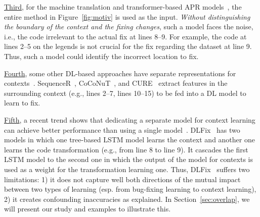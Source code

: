 
\underline{Third}, for the machine translation and transformer-based
APR
models~\cite{hata2018learning,tufano2019learning,tufano2018empirical},
the entire method in Figure~\ref{fig:motiv} is used as the input. {\em
  Without distinguishing the boundary of the context and the fixing
  changes}, such a model faces the noise, i.e., the code irrelevant to
the actual fix at lines 8--9. For example, the code at lines 2--5 on
the legends is not crucial for the fix regarding the dataset at line
9. Thus, such a model could identify the incorrect location to fix.

\underline{Fourth}, some other DL-based approaches have separate
representations for
contexts~\cite{chen2018sequencer,cure-icse21,lutellier2020coconut}.
SequenceR~\cite{chen2018sequencer},
CoCoNuT~\cite{lutellier2020coconut}, and CURE~\cite{cure-icse21}
extract features in the surrounding context (e.g., lines 2--7, lines
10--15) to be fed into a DL model to learn to fix.


\underline{Fifth}, a recent trend shows that
dedicating a separate model for context learning can achieve better
performance than using a single
model~\cite{icse20}. DLFix~\cite{icse20} has two models in which one
tree-based LSTM model learns the context and another one learns the
code transformation (e.g., from line 8 to line 9). It cascades the
first LSTM model to the second one in which the output of the model
for contexts is used as a weight for the transformation learning one.
Thus, DLFix~\cite{icse20} suffers two limitations: 1) it does not
capture well both directions of the mutual impact between two types of
learning (esp. from bug-fixing learning to context learning), 2) it
creates confounding inaccuracies as explained.
%
In Section~\ref{sec:overlap}, we will present our study and examples
to illustrate this.


